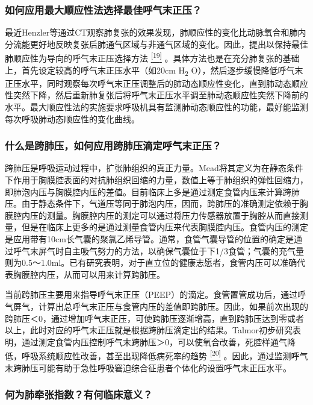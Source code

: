 \subsubsection{如何应用最大顺应性法选择最佳呼气末正压？}

最近Henzler等通过CT观察肺复张的效果发现，肺顺应性的变化比动脉氧合和肺内分流能更好地反映复张后肺通气区域与非通气区域的变化。因此，提出以保持最佳肺顺应性为导向的呼气末正压选择方法
\protect\hyperlink{text00011.htmlux5cux23ch19-10}{\textsuperscript{{[}19{]}}}
。具体方法也是在充分肺复张的基础上，首先设定较高的呼气末正压水平（如20cm
H\textsubscript{2}
O），然后逐步缓慢降低呼气末正压水平，同时观察每次呼气末正压调整后的肺动态顺应性变化，直到肺动态顺应性突然下降，然后重新肺复张后将呼气末正压水平调至肺动态顺应性突然下降前的水平。最大顺应性法的实施要求呼吸机具有监测肺动态顺应性的功能，最好能监测每次呼吸肺动态顺应性的变化曲线。

\subsubsection{什么是跨肺压，如何应用跨肺压滴定呼气末正压？}

跨肺压是呼吸运动过程中，扩张肺组织的真正力量。Mead将其定义为在静态条件下作用于胸膜腔表面的对抗肺组织回缩的力量，数值上等于肺组织的弹性回缩力，即肺泡内压与胸膜腔内压的差值。目前临床上多是通过测定食管内压来计算跨肺压。由于静态条件下，气道压等同于肺泡内压，因而，跨肺压的准确测定依赖于胸膜腔内压的测量。胸膜腔内压的测定可以通过将压力传感器放置于胸腔从而直接测量，但是在临床上更多的是通过测量食管内压来代表胸膜腔内压。食管内压的测定是应用带有10cm长气囊的聚氯乙烯导管。通常，食管气囊导管的位置的确定是通过呼气末屏气时自主吸气努力的方法，以确保气囊位于下1/3食管；气囊的充气量则为0.5～1.0ml。已有研究表明，对于直立位的健康志愿者，食管内压可以准确代表胸膜腔内压，从而可以用来计算跨肺压。

当前跨肺压主要用来指导呼气末正压（PEEP）的滴定。食管置管成功后，通过呼气屏气，计算出总呼气末正压与食管内压的差值即跨肺压。因此，如果前次出现的跨肺压＜0，通过增加呼气末正压，可使跨肺压逐渐增高，直到跨肺压达到零或者以上，此时对应的呼气末正压就是根据跨肺压滴定出的结果。Talmor初步研究表明，通过测定食管内压控制呼气末跨肺压＞0，可以使氧合改善，死腔样通气降低，呼吸系统顺应性改善，甚至出现降低病死率的趋势
\protect\hyperlink{text00011.htmlux5cux23ch20-10}{\textsuperscript{{[}20{]}}}
。因此，通过监测呼气末跨肺压可能有助于急性呼吸窘迫综合征患者个体化的设置呼气末正压水平。

\subsubsection{何为肺牵张指数？有何临床意义？}

